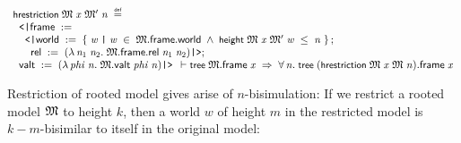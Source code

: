 \documentclass[letterpaper]{article}
\renewcommand{\HOLConst}[1]{{\textsf{\upshape\small #1}}}
\renewcommand{\HOLinline}[1]{\ensuremath{#1}}
\newenvironment{holmath}{\begin{displaymath}\begin{array}{l}}{\end{array}\end{displaymath}\ignorespacesafterend}
\begin{document}
\begin{holmath}
  \HOLConst{hrestriction}\;\HOLFreeVar{\ensuremath{\mathfrak{M}}}\;\HOLFreeVar{x}\;\HOLFreeVar{\ensuremath{\mathfrak{M}'}}\;\HOLFreeVar{n}\;\HOLSymConst{\HOLTokenDefEquality{}}\\
\;\;\HOLTokenLeftrec{}\HOLFieldName{frame}\;:=\\
\;\;\;\;\HOLTokenLeftrec{}\HOLFieldName{world}\;:=\;\HOLTokenLeftbrace{}\HOLBoundVar{w}\;\HOLTokenBar{}\;\HOLBoundVar{w}\;\HOLSymConst{\HOLTokenIn{}}\;\HOLFreeVar{\ensuremath{\mathfrak{M}}}.\HOLFieldName{frame}.\HOLFieldName{world}\;\HOLSymConst{\HOLTokenConj{}}\;\HOLConst{height}\;\HOLFreeVar{\ensuremath{\mathfrak{M}}}\;\HOLFreeVar{x}\;\HOLFreeVar{\ensuremath{\mathfrak{M}'}}\;\HOLBoundVar{w}\;\HOLSymConst{\HOLTokenLeq{}}\;\HOLFreeVar{n}\HOLTokenRightbrace{};\\
\;\;\;\;\;\;\HOLFieldName{rel}\;:=\;(\HOLTokenLambda{}\HOLBoundVar{n\sb{\mathrm{1}}}\;\HOLBoundVar{n\sb{\mathrm{2}}}.\;\HOLFreeVar{\ensuremath{\mathfrak{M}}}.\HOLFieldName{frame}.\HOLFieldName{rel}\;\HOLBoundVar{n\sb{\mathrm{1}}}\;\HOLBoundVar{n\sb{\mathrm{2}}})\HOLTokenRightrec{};\\
\;\;\HOLFieldName{valt}\;:=\;(\HOLTokenLambda{}\HOLBoundVar{phi}\;\HOLBoundVar{n}.\;\HOLFreeVar{\ensuremath{\mathfrak{M}}}.\HOLFieldName{valt}\;\HOLBoundVar{phi}\;\HOLBoundVar{n})\HOLTokenRightrec{}
  \ensuremath{\HOLTokenTurnstile}\HOLConst{tree}\;\HOLFreeVar{\ensuremath{\mathfrak{M}}}.\HOLFieldName{frame}\;\HOLFreeVar{x}\;\HOLSymConst{\HOLTokenImp{}}\;\HOLSymConst{\HOLTokenForall{}}\HOLBoundVar{n}.\;\HOLConst{tree}\;(\HOLConst{hrestriction}\;\HOLFreeVar{\ensuremath{\mathfrak{M}}}\;\HOLFreeVar{x}\;\HOLFreeVar{\ensuremath{\mathfrak{M}}}\;\HOLBoundVar{n}).\HOLFieldName{frame}\;\HOLFreeVar{x}
\end{holmath}

Restriction of rooted model gives arise of $n$-bisimulation: If we restrict a rooted model \HOLinline{\HOLFreeVar{\ensuremath{\mathfrak{M}}}} to height $k$, then a world $w$ of height $m$ in the restricted model is $k-m$-bisimilar to itself in the original model:
\end{document}
